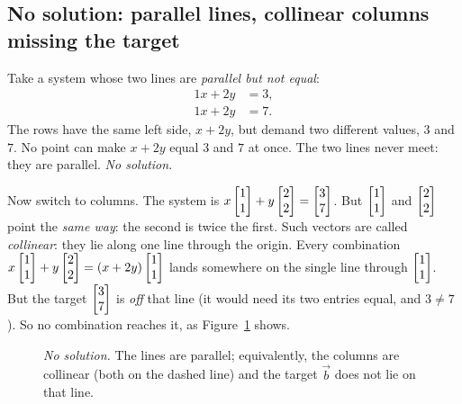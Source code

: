 \subsection{No solution: parallel lines, collinear columns missing the target}

Take a system whose two lines are \emph{parallel but not equal}:
\begin{equation}
  \label{ch06:nosol}
  \begin{aligned}
    1x + 2y &= 3,\\
    1x + 2y &= 7.
  \end{aligned}
\end{equation}
The rows have the same left side, $x+2y$, but demand two different values,
$3$ and $7$. No point can make $x+2y$ equal $3$ and $7$ at once. The two
lines never meet: they are parallel. \emph{No solution.}

Now switch to columns. The system is
$x\begin{bmatrix}1\\1\end{bmatrix}+y\begin{bmatrix}2\\2\end{bmatrix}=\begin{bmatrix}3\\7\end{bmatrix}$. But $\begin{bmatrix}1\\1\end{bmatrix}$ and
$\begin{bmatrix}2\\2\end{bmatrix}$ point the \emph{same way}: the second is twice the
first. Such vectors are called \emph{collinear}: they lie along one line
through the origin. Every combination
$x\begin{bmatrix}1\\1\end{bmatrix}+y\begin{bmatrix}2\\2\end{bmatrix}=(x+2y)\begin{bmatrix}1\\1\end{bmatrix}$
lands somewhere on the single line through $\begin{bmatrix}1\\1\end{bmatrix}$. But the target
$\begin{bmatrix}3\\7\end{bmatrix}$ is \emph{off} that line (it would need its two entries equal,
and $3\neq7$). So no combination reaches it, as Figure~\ref{ch06:none}
shows.

\begin{figure}[H]
\centering
{}
\caption{\emph{No solution.} The lines are parallel; equivalently, the
columns are collinear (both on the dashed line) and the target $\vec b$ does
not lie on that line.}
\label{ch06:none}
\end{figure}

